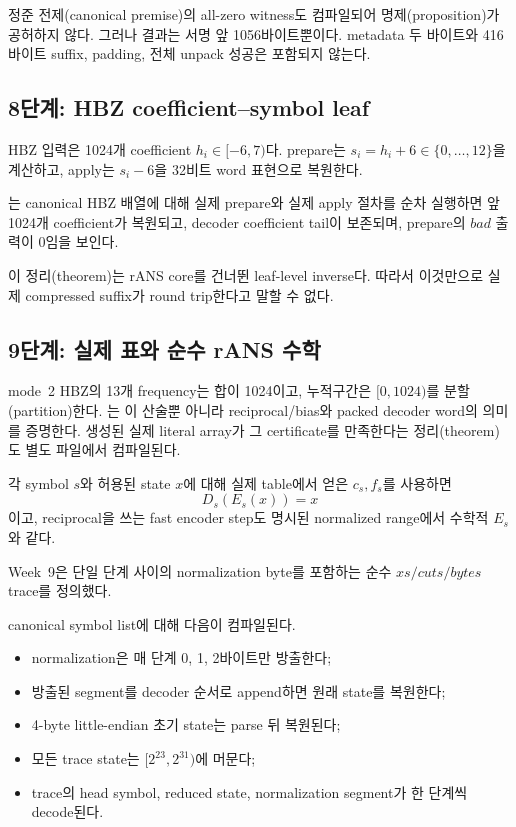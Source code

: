 정준 전제(canonical premise)의 all-zero witness도 컴파일되어
명제(proposition)가 공허하지
않다. 그러나 결과는
서명 앞 1056바이트뿐이다. metadata 두 바이트와 416바이트 suffix, padding,
전체 unpack 성공은 포함되지 않는다.

\subsection{8단계: HBZ coefficient--symbol leaf}

HBZ 입력은 1024개 coefficient \(h_i\in[-6,7)\)다. prepare는
\(s_i=h_i+6\in\{0,\ldots,12\}\)을 계산하고, apply는 \(s_i-6\)을 32비트
word 표현으로 복원한다.

\begin{verified}
는 canonical HBZ 배열에
대해 실제 prepare와 실제 apply 절차를 순차 실행하면 앞 1024개 coefficient가
복원되고, decoder coefficient tail이 보존되며, prepare의 \(bad\) 출력이 0임을
보인다.
\end{verified}

이 정리(theorem)는 rANS core를 건너뛴 leaf-level inverse다. 따라서 이것만으로 실제
compressed suffix가 round trip한다고 말할 수 없다.

\subsection{9단계: 실제 표와 순수 rANS 수학}

mode~2 HBZ의 13개 frequency는 합이 1024이고, 누적구간은
\([0,1024)\)를 분할(partition)한다. 는 이
산술뿐 아니라 reciprocal/bias와 packed decoder word의 의미를 증명한다.
생성된 실제 literal array가 그 certificate를 만족한다는 정리(theorem)도 별도 파일에서
컴파일된다.

\begin{verified}
각 symbol \(s\)와 허용된 state \(x\)에 대해 실제 table에서 얻은
\(c_s,f_s\)를 사용하면
\[
  D_s(E_s(x))=x
\]
이고, reciprocal을 쓰는 fast encoder step도 명시된 normalized range에서
수학적 \(E_s\)와 같다.
\end{verified}

Week~9은 단일 단계 사이의 normalization byte를 포함하는 순수
\(xs/cuts/bytes\) trace를 정의했다.

\begin{verified}
canonical symbol list에 대해 다음이 컴파일된다.
\begin{itemize}
  \item normalization은 매 단계 0, 1, 2바이트만 방출한다;
  \item 방출된 segment를 decoder 순서로 append하면 원래 state를 복원한다;
  \item 4-byte little-endian 초기 state는 parse 뒤 복원된다;
  \item 모든 trace state는 \([2^{23},2^{31})\)에 머문다;
  \item trace의 head symbol, reduced state, normalization segment가 한 단계씩
        decode된다.
\end{itemize}
\end{verified}

